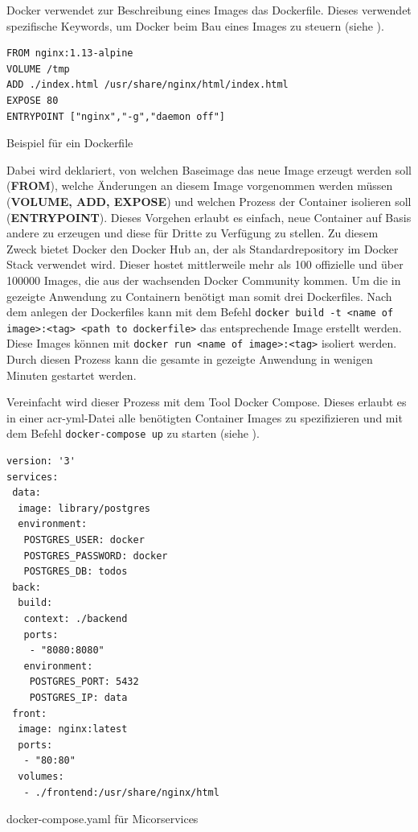 Docker verwendet zur Beschreibung eines Images das Dockerfile. Dieses verwendet spezifische Keywords, um Docker beim Bau eines Images zu steuern (siehe ).

\begin{listing}[h]
	\begin{verbatim}
FROM nginx:1.13-alpine
VOLUME /tmp
ADD ./index.html /usr/share/nginx/html/index.html
EXPOSE 80
ENTRYPOINT ["nginx","-g","daemon off"]
	\end{verbatim}
	\caption{Beispiel für ein Dockerfile}
	\label{lst:dockerfileExmpl}
\end{listing}

Dabei wird deklariert, von welchen Baseimage das neue Image erzeugt werden soll (\textbf{FROM}), welche Änderungen an diesem Image vorgenommen werden müssen (\textbf{VOLUME, ADD, EXPOSE}) und welchen Prozess der Container isolieren soll (\textbf{ENTRYPOINT}). Dieses Vorgehen erlaubt es einfach, neue Container auf Basis andere zu erzeugen und diese für Dritte zu Verfügung zu stellen. Zu diesem Zweck bietet Docker den Docker Hub an, der als Standardrepository im Docker Stack verwendet wird. Dieser hostet mittlerweile mehr als 100 offizielle und über 100000 Images, die aus der wachsenden Docker Community kommen. Um die in  gezeigte Anwendung zu Containern benötigt man somit drei Dockerfiles. Nach dem anlegen der Dockerfiles kann mit dem Befehl \texttt{docker build -t <name of image>:<tag> <path to dockerfile>} das entsprechende Image erstellt werden. Diese Images können mit \texttt{docker run <name of image>:<tag>} isoliert werden. Durch diesen Prozess kann die gesamte in  gezeigte Anwendung in wenigen Minuten gestartet werden.

Vereinfacht wird dieser Prozess mit dem Tool Docker Compose. Dieses erlaubt es in einer \gls{acr-yml}-Datei alle benötigten Container Images zu spezifizieren und mit dem Befehl \texttt{docker-compose up} zu starten (siehe ).

\begin{listing}[h]
	\begin{verbatim}
version: '3'
services:
 data:
  image: library/postgres
  environment:
   POSTGRES_USER: docker
   POSTGRES_PASSWORD: docker
   POSTGRES_DB: todos
 back:
  build:
   context: ./backend
   ports:
    - "8080:8080"
   environment:
    POSTGRES_PORT: 5432
    POSTGRES_IP: data
 front:
  image: nginx:latest
  ports:
   - "80:80"
  volumes:
   - ./frontend:/usr/share/nginx/html
	\end{verbatim}
	\caption{docker-compose.yaml für Micorservices}
	\label{lst:dockerComposeTodos}
\end{listing}

